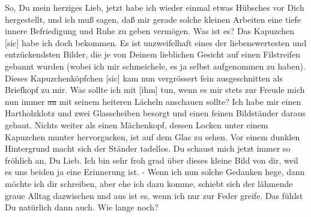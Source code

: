 \def\day{2. Februar 1944.}
\mktitle

So, Du mein herziges Lieb, jetzt habe ich wieder einmal etwas H\"{u}bsches vor Dich hergestellt, und ich mu{\ss} sagen, da{\ss} mir gerade solche kleinen Arbeiten eine tiefe innere Befriedigung und Ruhe zu geben verm\"{o}gen.
Was ist es?
Das Kapuzchen{\color{red} [sic] } habe ich doch bekommen.
Es ist unzweifelhaft eines der liebenswertesten und entz\"{u}ckendsten Bilder, die je von Deinem lieblichen Gesicht auf einen Filstreifen gebannt wurden (wobei ich mir schmeichele, es ja selbst aufgenommen zu haben).
Dieses Kapuzchenk\"{o}pfchen{\color{red} [sic] } kam nun vergr\"{o}ssert fein ausgeschnitten als Briefkopf zu mir.
Was sollte ich mit {\color{red} [ihm] } tun, wenn es mir stets zur Freude mich nun immer \st{an} mit seinem heiteren L\"{a}cheln anschauen sollte?
Ich habe mir einen Hartholzklotz und zwei Glasscheiben besorgt und einen feinen Bildst\"{a}nder daraus gebaut.
Nichts weiter als einen M\"{a}chenkopf, dessen Locken unter einem Kapuzchen munter hervorgucken, ist auf dem Glas zu sehen.
Vor einem dunklen Hintergrund macht sich der St\"{a}nder tadellos.
Du schaust mich jetzt immer so fr\"{o}hlich an, Du Lieb.
Ich bin sehr froh grad \"{u}ber dieses kleine Bild von dir, weil es uns beiden ja eine Erinnerung ist.
- Wenn ich nun solche Gedanken hege, dann m\"{o}chte ich dir schreiben, aber ehe ich dazu komme, schiebt sich der l\"{a}hmende graue Alltag dazwischen und aus ist es, wenn ich nur zur Feder greife.
Das f\"{u}hlst Du nat\"{u}rlich dann auch.
Wie lange noch?

\clearpage
